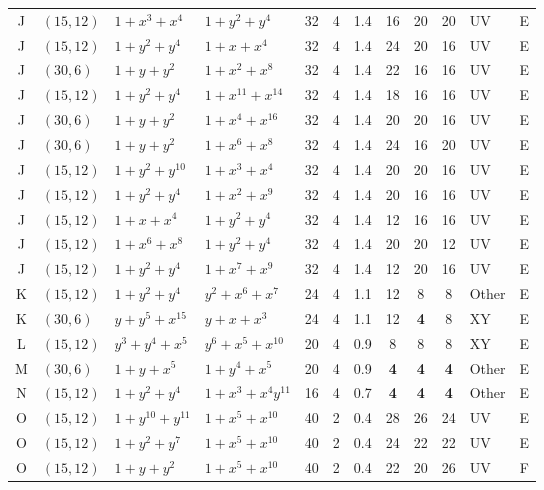 \begin{table}[t]
\begin{tabular*}{\textwidth}{@{\extracolsep{\fill}}clllcccccclc}
J & $(15,12)$ & $1{+}x^{3}{+}x^{4}$ & $1{+}y^{2}{+}y^{4}$ & 32 & 4 & 1.4 & 16 & 20 & 20 & UV & E \\
J & $(15,12)$ & $1{+}y^{2}{+}y^{4}$ & $1{+}x{+}x^{4}$ & 32 & 4 & 1.4 & 24 & 20 & 16 & UV & E \\
J & $(30,6)$ & $1{+}y{+}y^{2}$ & $1{+}x^{2}{+}x^{8}$ & 32 & 4 & 1.4 & 22 & 16 & 16 & UV & E \\
J & $(15,12)$ & $1{+}y^{2}{+}y^{4}$ & $1{+}x^{11}{+}x^{14}$ & 32 & 4 & 1.4 & 18 & 16 & 16 & UV & E \\
J & $(30,6)$ & $1{+}y{+}y^{2}$ & $1{+}x^{4}{+}x^{16}$ & 32 & 4 & 1.4 & 20 & 20 & 16 & UV & E \\
J & $(30,6)$ & $1{+}y{+}y^{2}$ & $1{+}x^{6}{+}x^{8}$ & 32 & 4 & 1.4 & 24 & 16 & 20 & UV & E \\
J & $(15,12)$ & $1{+}y^{2}{+}y^{10}$ & $1{+}x^{3}{+}x^{4}$ & 32 & 4 & 1.4 & 20 & 20 & 16 & UV & E \\
J & $(15,12)$ & $1{+}y^{2}{+}y^{4}$ & $1{+}x^{2}{+}x^{9}$ & 32 & 4 & 1.4 & 20 & 16 & 16 & UV & E \\
J & $(15,12)$ & $1{+}x{+}x^{4}$ & $1{+}y^{2}{+}y^{4}$ & 32 & 4 & 1.4 & 12 & 16 & 16 & UV & E \\
J & $(15,12)$ & $1{+}x^{6}{+}x^{8}$ & $1{+}y^{2}{+}y^{4}$ & 32 & 4 & 1.4 & 20 & 20 & 12 & UV & E \\
J & $(15,12)$ & $1{+}y^{2}{+}y^{4}$ & $1{+}x^{7}{+}x^{9}$ & 32 & 4 & 1.4 & 12 & 20 & 16 & UV & E \\
K & $(15,12)$ & $1{+}y^{2}{+}y^{4}$ & $y^{2}{+}x^{6}{+}x^{7}$ & 24 & 4 & 1.1 & 12 & 8 & 8 & Other & E \\
K & $(30,6)$ & $y{+}y^{5}{+}x^{15}$ & $y{+}x{+}x^{3}$ & 24 & 4 & 1.1 & 12 & \textbf{4} & 8 & XY & E \\
L & $(15,12)$ & $y^{3}{+}y^{4}{+}x^{5}$ & $y^{6}{+}x^{5}{+}x^{10}$ & 20 & 4 & 0.9 & 8 & 8 & 8 & XY & E \\
M & $(30,6)$ & $1{+}y{+}x^{5}$ & $1{+}y^{4}{+}x^{5}$ & 20 & 4 & 0.9 & \textbf{4} & \textbf{4} & \textbf{4} & Other & E \\
N & $(15,12)$ & $1{+}y^{2}{+}y^{4}$ & $1{+}x^{3}{+}x^{4}y^{11}$ & 16 & 4 & 0.7 & \textbf{4} & \textbf{4} & \textbf{4} & Other & E \\
O & $(15,12)$ & $1{+}y^{10}{+}y^{11}$ & $1{+}x^{5}{+}x^{10}$ & 40 & 2 & 0.4 & 28 & 26 & 24 & UV & E \\
O & $(15,12)$ & $1{+}y^{2}{+}y^{7}$ & $1{+}x^{5}{+}x^{10}$ & 40 & 2 & 0.4 & 24 & 22 & 22 & UV & E \\
O & $(15,12)$ & $1{+}y{+}y^{2}$ & $1{+}x^{5}{+}x^{10}$ & 40 & 2 & 0.4 & 22 & 20 & 26 & UV & F \\

\end{tabular*}
\end{table}
